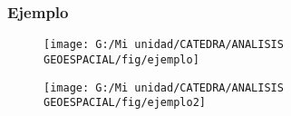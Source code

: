 \documentclass[14pt]{beamer}
\begin{document}
\begin{frame}
\frametitle{Ejemplo}
 \begin{figure}
    \centering
    \texttt{[image: G:/Mi unidad/CATEDRA/ANALISIS GEOESPACIAL/fig/ejemplo]}
  \end{figure}
\end{frame}
\begin{frame}
\begin{figure}
    \centering
    \texttt{[image: G:/Mi unidad/CATEDRA/ANALISIS GEOESPACIAL/fig/ejemplo2]}
  \end{figure}
\end{frame}
\end{document}
